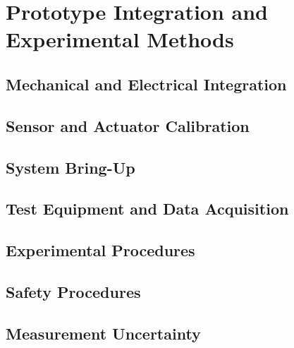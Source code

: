 \chapter{Prototype Integration and Experimental Methods}

\section{Mechanical and Electrical Integration}

\section{Sensor and Actuator Calibration}

\section{System Bring-Up}

\section{Test Equipment and Data Acquisition}

\section{Experimental Procedures}

\section{Safety Procedures}

\section{Measurement Uncertainty}
